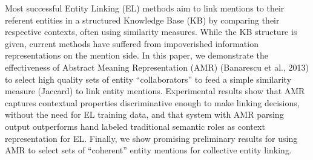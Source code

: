 Most successful Entity Linking (EL) methods aim to link mentions to their referent entities in a structured Knowledge Base (KB) by comparing their respective contexts, often using similarity measures. While the KB structure is given, current methods have suffered from impoverished information representations on the mention side. In this paper, we demonstrate the effectiveness of Abstract Meaning Representation (AMR) (Banarescu et al., 2013) to select high quality sets of entity ``collaborators'' to feed a simple similarity measure (Jaccard) to link entity mentions. Experimental results show that AMR captures contextual properties discriminative enough to make linking decisions, without the need for EL training data, and that system with AMR parsing output outperforms hand labeled traditional semantic roles as context representation for EL. Finally, we show promising preliminary results for using AMR to select sets of ``coherent'' entity mentions for collective entity linking.
